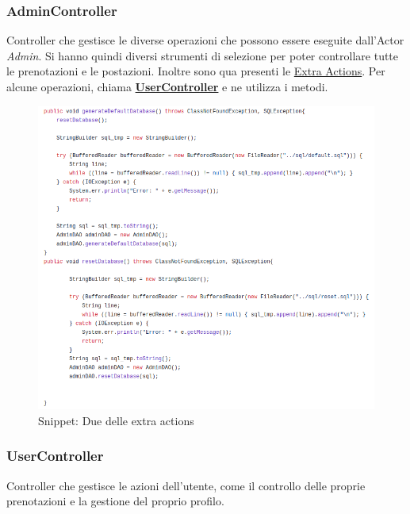 \documentclass{article}
\begin{document}
{\subsubsection{AdminController}\label{subsubsec:admincontroller}
Controller che gestisce le diverse operazioni che possono essere eseguite dall'Actor \textit{Admin}. Si hanno quindi diversi strumenti di selezione per poter controllare tutte le prenotazioni e le postazioni. Inoltre sono qua presenti le \hyperref[fig:admincontrollerSnippets]{Extra Actions}. Per alcune operazioni, chiama \hyperref[subsubsec:usercontroller]{\textbf{UserController}} e ne utilizza i metodi.
\begin{figure}[H]
                \centering
                \includegraphics[width=\textwidth]{Images/Snippets/AdminControllerSnippets.png}
                \caption{Snippet: Due delle extra actions}
                \label{fig:admincontrollerSnippets}
            \end{figure}
\subsubsection{UserController}\label{subsubsec:usercontroller}
Controller che gestisce le azioni dell'utente, come il controllo delle proprie prenotazioni e la gestione del proprio profilo. 


}
\end{document}
